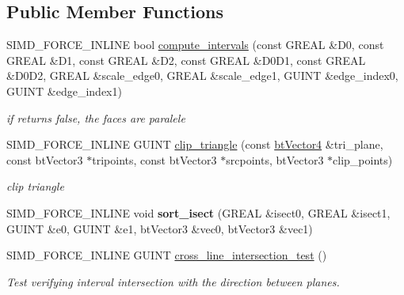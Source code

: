 \subsection*{Public Member Functions}
\begin{DoxyCompactItemize}
\item 
\mbox{\label{classGIM__TRIANGLE__CALCULATION__CACHE_ac7148501d7abedb29153fe729cab4558}} 
S\+I\+M\+D\+\_\+\+F\+O\+R\+C\+E\+\_\+\+I\+N\+L\+I\+NE bool \hyperlink{classGIM__TRIANGLE__CALCULATION__CACHE_ac7148501d7abedb29153fe729cab4558}{compute\+\_\+intervals} (const G\+R\+E\+AL \&D0, const G\+R\+E\+AL \&D1, const G\+R\+E\+AL \&D2, const G\+R\+E\+AL \&D0\+D1, const G\+R\+E\+AL \&D0\+D2, G\+R\+E\+AL \&scale\+\_\+edge0, G\+R\+E\+AL \&scale\+\_\+edge1, G\+U\+I\+NT \&edge\+\_\+index0, G\+U\+I\+NT \&edge\+\_\+index1)
\begin{DoxyCompactList}\small\item\em if returns false, the faces are paralele \end{DoxyCompactList}\item 
\mbox{\label{classGIM__TRIANGLE__CALCULATION__CACHE_ac07d15d399c84583e1c5411a379f85bb}} 
S\+I\+M\+D\+\_\+\+F\+O\+R\+C\+E\+\_\+\+I\+N\+L\+I\+NE G\+U\+I\+NT \hyperlink{classGIM__TRIANGLE__CALCULATION__CACHE_ac07d15d399c84583e1c5411a379f85bb}{clip\+\_\+triangle} (const \hyperlink{classbtVector4}{bt\+Vector4} \&tri\+\_\+plane, const bt\+Vector3 $\ast$tripoints, const bt\+Vector3 $\ast$srcpoints, bt\+Vector3 $\ast$clip\+\_\+points)
\begin{DoxyCompactList}\small\item\em clip triangle \end{DoxyCompactList}\item 
\mbox{\label{classGIM__TRIANGLE__CALCULATION__CACHE_ad1369ac1b47538278c1e3f55db600bc3}} 
S\+I\+M\+D\+\_\+\+F\+O\+R\+C\+E\+\_\+\+I\+N\+L\+I\+NE void {\bfseries sort\+\_\+isect} (G\+R\+E\+AL \&isect0, G\+R\+E\+AL \&isect1, G\+U\+I\+NT \&e0, G\+U\+I\+NT \&e1, bt\+Vector3 \&vec0, bt\+Vector3 \&vec1)
\item 
S\+I\+M\+D\+\_\+\+F\+O\+R\+C\+E\+\_\+\+I\+N\+L\+I\+NE G\+U\+I\+NT \hyperlink{classGIM__TRIANGLE__CALCULATION__CACHE_a8ce209ccff8cdd7ece72b0465e222a85}{cross\+\_\+line\+\_\+intersection\+\_\+test} ()
\begin{DoxyCompactList}\small\item\em Test verifying interval intersection with the direction between planes. \end{DoxyCompactList}\item 

\end{DoxyCompactItemize}
